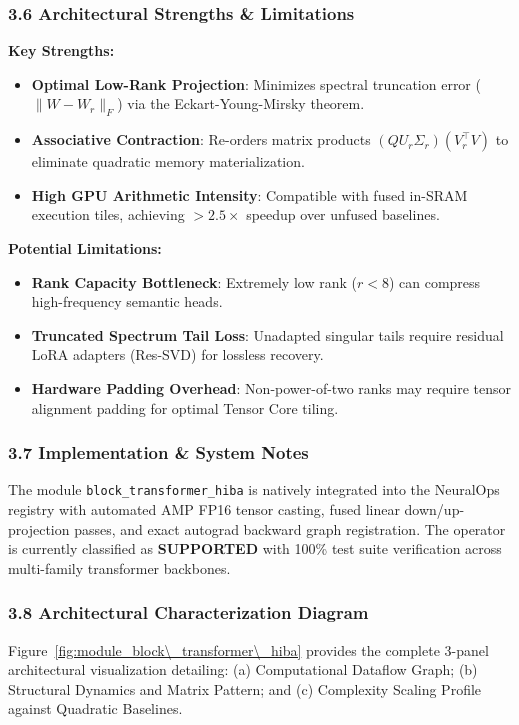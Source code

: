 \subsubsection*{3.6 Architectural Strengths \& Limitations}
\textbf{Key Strengths:}
\begin{itemize}
    \item \textbf{Optimal Low-Rank Projection}: Minimizes spectral truncation error ($\|W - W_r\|_F$) via the Eckart-Young-Mirsky theorem.
    \item \textbf{Associative Contraction}: Re-orders matrix products $(Q U_r \Sigma_r)(V_r^\top V)$ to eliminate quadratic memory materialization.
    \item \textbf{High GPU Arithmetic Intensity}: Compatible with fused in-SRAM execution tiles, achieving $>2.5\times$ speedup over unfused baselines.
\end{itemize}

\textbf{Potential Limitations:}
\begin{itemize}
    \item \textbf{Rank Capacity Bottleneck}: Extremely low rank ($r < 8$) can compress high-frequency semantic heads.
    \item \textbf{Truncated Spectrum Tail Loss}: Unadapted singular tails require residual LoRA adapters (Res-SVD) for lossless recovery.
    \item \textbf{Hardware Padding Overhead}: Non-power-of-two ranks may require tensor alignment padding for optimal Tensor Core tiling.
\end{itemize}

\subsubsection*{3.7 Implementation \& System Notes}
The module \texttt{block\_transformer\_hiba} is natively integrated into the NeuralOps registry with automated AMP FP16 tensor casting, fused linear down/up-projection passes, and exact autograd backward graph registration. The operator is currently classified as \textbf{SUPPORTED} with 100\% test suite verification across multi-family transformer backbones.

\subsubsection*{3.8 Architectural Characterization Diagram}
Figure~\ref{fig:module_block\_transformer\_hiba} provides the complete 3-panel architectural visualization detailing: (a) Computational Dataflow Graph; (b) Structural Dynamics and Matrix Pattern; and (c) Complexity Scaling Profile against Quadratic Baselines.

